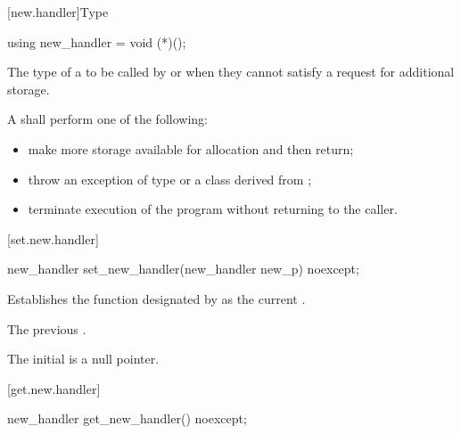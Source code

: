 [new.handler]{Type }

\begin{indexed}{}
\begin{itemdecl}
using new_handler = void (*)();
\end{itemdecl}
\end{indexed}

\begin{itemdescr}
\pnum
The type of a
to be called by
or
 when they cannot satisfy a request for additional storage.

\pnum
\required
A  shall perform one of the following:

\begin{itemize}
\item
make more storage available for allocation and then return;
\item
throw an exception of type
or a class derived from
%
;
\item
terminate execution of the program without returning to the caller.
%
%
\end{itemize}
\end{itemdescr}

[set.new.handler]{}

%
\begin{itemdecl}
new_handler set_new_handler(new_handler new_p) noexcept;
\end{itemdecl}

\begin{itemdescr}
\pnum
\effects
Establishes the function designated by  as the current
.

\pnum
\returns
The previous .

\pnum
\remarks
The initial  is a null pointer.
\end{itemdescr}

[get.new.handler]{}

%
\begin{itemdecl}
new_handler get_new_handler() noexcept;
\end{itemdecl}

